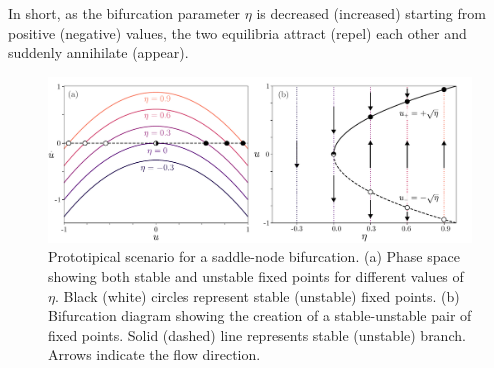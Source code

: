 In short, as the bifurcation parameter $\eta$ is decreased (increased)
starting from positive (negative) values, the two equilibria attract (repel) each other and suddenly annihilate (appear).

\begin{figure}[h]
    \centering
    \includegraphics[width=\textwidth]{imagenes/framework/bif_sn_f.pdf}
    \caption{Prototipical scenario for a saddle-node bifurcation. (a) Phase space
    showing both stable and unstable fixed points for different values of $\eta$. 
    Black (white) circles represent
    stable (unstable) fixed points. (b) Bifurcation diagram showing
    the creation of a stable-unstable pair of fixed points. Solid (dashed) line represents
    stable (unstable) branch. Arrows indicate the flow direction.}
    \label{fig:pre_bifs_sn}
\end{figure}

